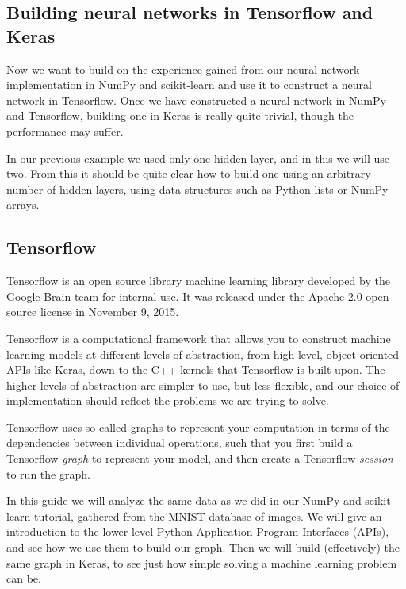 \documentclass[%
oneside,                 %
final,                   %
10pt]{article}
\begin{document}
\subsection*{Building neural networks in Tensorflow and Keras}

Now we want  to build on the experience gained from our neural network implementation in NumPy and scikit-learn
and use it to construct a neural network in Tensorflow. Once we have constructed a neural network in NumPy
and Tensorflow, building one in Keras is really quite trivial, though the performance may suffer.  

In our previous example we used only one hidden layer, and in this we will use two. From this it should be quite
clear how to build one using an arbitrary number of hidden layers, using data structures such as Python lists or
NumPy arrays.

\subsection*{Tensorflow}

Tensorflow is an open source library machine learning library
developed by the Google Brain team for internal use. It was released
under the Apache 2.0 open source license in November 9, 2015.

Tensorflow is a computational framework that allows you to construct
machine learning models at different levels of abstraction, from
high-level, object-oriented APIs like Keras, down to the C++ kernels
that Tensorflow is built upon. The higher levels of abstraction are
simpler to use, but less flexible, and our choice of implementation
should reflect the problems we are trying to solve.

\href{{https://www.tensorflow.org/guide/graphs}}{Tensorflow uses} so-called graphs to represent your computation
in terms of the dependencies between individual operations, such that you first build a Tensorflow \emph{graph}
to represent your model, and then create a Tensorflow \emph{session} to run the graph.

In this guide we will analyze the same data as we did in our NumPy and
scikit-learn tutorial, gathered from the MNIST database of images. We
will give an introduction to the lower level Python Application
Program Interfaces (APIs), and see how we use them to build our graph.
Then we will build (effectively) the same graph in Keras, to see just
how simple solving a machine learning problem can be.
\end{document}
